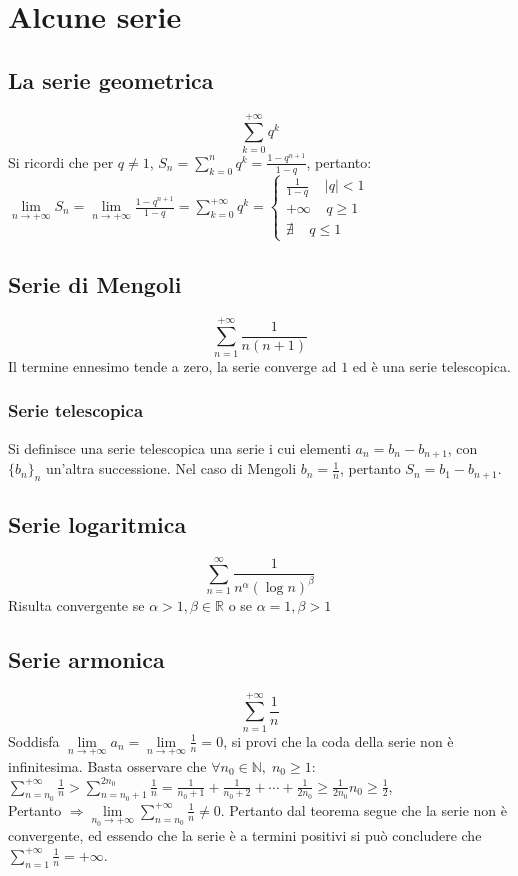 \chapter{Alcune serie}
\section{La serie geometrica}
\begin{equation}
\sum\limits_{k=0}^{+\infty}q^k
\end{equation}
Si ricordi che per $q\neq 1$, $S_n=\sum\limits_{k=0}^n q^k=\frac{1-q^{n+1}}{1-q}$, pertanto:\\
$\lim\limits_{n\rightarrow+\infty}S_n=\lim\limits_{n\rightarrow+\infty}\frac{1-q^{n+1}}{1-q}=\sum\limits_{k=0}^{+\infty}q^k=
\begin{cases}
\frac{1}{1-q}\;\;\;\;|q|<1\\
+\infty\;\;\;\;q\ge 1\\
\nexists\;\;\;\;q\le 1
\end{cases}
$
\section{Serie di Mengoli}
\begin{equation}
\sum\limits_{n=1}^{+\infty}\dfrac{1}{n(n+1)}
\end{equation}
Il termine ennesimo tende a zero, la serie converge ad $1$ ed \`e una serie telescopica.
\subsection{Serie telescopica}
Si definisce una serie telescopica una serie i cui elementi $a_n=b_n-b_{n+1}$, con $\{b_n\}_n$ un'altra successione. Nel caso di Mengoli $b_n=\frac{1}{n}$, pertanto $S_n=b_1-b_{n+1}$.
\section{Serie logaritmica}
\begin{equation}
\sum\limits_{n=1}^\infty \dfrac{1}{n^\alpha(\log n)^\beta}
\end{equation}
Risulta convergente se $\alpha>1,\beta\in\mathbb{R}$ o se $\alpha=1, \beta>1$
\section{Serie armonica}
\begin{equation}
\sum\limits_{n=1}^{+\infty}\dfrac{1}{n}
\end{equation}
Soddisfa $\lim\limits_{n\rightarrow+\infty}a_n=\lim\limits_{n\rightarrow+\infty}\frac{1}{n}=0$, si provi che la coda della serie non \`e infinitesima. Basta osservare che $\forall n_0\in\mathbb{N},\; n_0\ge 1$:\\
$\sum\limits_{n=n_0}^{+\infty}\frac{1}{n}>\sum\limits_{n=n_0+1}^{2n_0}\frac{1}{n}=\frac{1}{n_0+1}+\frac{1}{n_0+2}+\cdots+\frac{1}{2n_0}\ge \frac{1}{2n_0}n_0\ge\frac{1}{2}$,\\
Pertanto $\Rightarrow\lim\limits_{n_0\rightarrow+\infty}\sum\limits_{n=n_0}^{+\infty}\frac{1}{n}\neq 0$. Pertanto dal teorema segue che la serie non \`e convergente, ed essendo che la 
serie \`e a termini positivi si pu\`o concludere che $\sum\limits_{n=1}^{+\infty}\frac{1}{n}=+\infty$.
